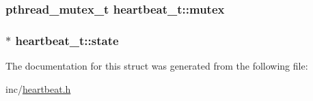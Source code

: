 \hypertarget{structheartbeat__t_db9333d409eb60db5e3e63d9b3d193a3}{
\subsubsection[mutex]{\setlength{\rightskip}{0pt plus 5cm}pthread\_\-mutex\_\-t {\bf heartbeat\_\-t::mutex}}}
\label{structheartbeat__t_db9333d409eb60db5e3e63d9b3d193a3}


\hypertarget{structheartbeat__t_a7c199aeb3f806c107e64cd8aa0a0c92}{
\subsubsection[state]{$\ast$ {\bf heartbeat\_\-t::state}}}
\label{structheartbeat__t_a7c199aeb3f806c107e64cd8aa0a0c92}




The documentation for this struct was generated from the following file:\begin{CompactItemize}
\item 
inc/\hyperlink{heartbeat_8h}{heartbeat.h}\end{CompactItemize}
